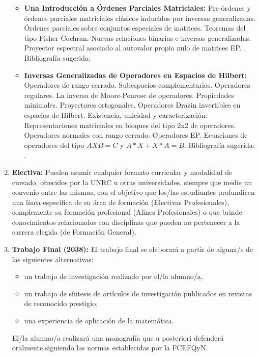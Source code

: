 \documentclass[a4paper, 12pt]{article}
\begin{document}
\begin{enumerate}
\begin{itemize}
\item\textbf{Una Introducción a Órdenes Parciales Matriciales:} Pre-órdenes y órdenes parciales matriciales clásicos inducidos por inversas generalizadas. Órdenes parciales sobre conjuntos especiales de matrices. Teoremas del tipo Fisher-Cochran. Nuevas relaciones binarias e inversas generalizadas. Proyector espectral asociado al autovalor propio nulo de matrices EP.
. Bibliografía sugerida: \cite{BaTr1, BaBaLi, BaHa, BaHaLiLi, FeMa1, FeMa2, FeLaLeTh, HaSt, HaSp, Ku, Ma, MiBhMa}

\item\textbf{ Inversas Generalizadas de Operadores en Espacios de Hilbert: }Operadores de rango cerrado. Subespacios complementarios. Operadores regulares. La inversa de Moore-Penrose de operadores. Propiedades minimales. Proyectores ortogonales.  Operadores Drazin invertibles en espacios de Hilbert. Existencia, unicidad y caracterización. Representaciones matriciales en bloques del tipo 2x2 de operadores. Operadores normales con rango cerrado. Operadores EP. Ecuaciones de operadores del tipo $AXB=C$ y $A* X + X* A=B$. Bibliografía sugerida: \cite{CvWe, DjRa,Ka,WaWeQi,FeLaLeTh}.

\end{itemize}









\item\textbf{Electiva:}
Pueden asumir cualquier formato curricular y modalidad de cursado, ofrecidos por la UNRC u otras universidades, siempre que medie un convenio entre las mismas, con el objetivo que los/las estudiantes profundicen una línea específica de su área de formación (Electivas Profesionales), complemente su formación profesional (Afines Profesionales) o que brinde conocimientos relacionados con disciplinas que pueden no pertenecer a la carrera elegida (de Formación General).


\item\textbf{Trabajo Final (2038):} El trabajo
final se elaborará a partir de alguna/s de las siguientes
alternativas:
\begin{itemize}
\item un trabajo de investigación realizado por el/la alumno/a,
\item un trabajo de síntesis de artículos de investigación publicados en
revistas de reconocido prestigio,
\item una experiencia de aplicación de la matemática.
\end{itemize}

El/la alumno/a realizará una monografía  que a posteriori defenderá
oralmente siguiendo las normas establecidas por la FCEFQyN.

\end{enumerate}
\end{document}
